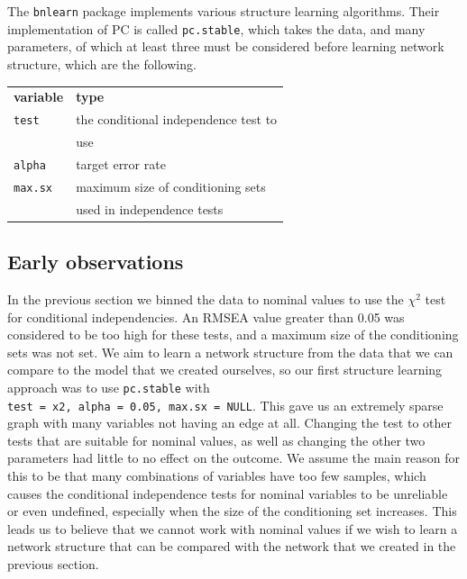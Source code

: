\documentclass[11pt,]{article}
\begin{document}
\begin{multicols}{2}
The \texttt{bnlearn} package implements various structure learning
algorithms. Their implementation of PC is called \texttt{pc.stable},
which takes the data, and many parameters, of which at least three must
be considered before learning network structure, which are the
following.

\medskip
\begin{tabular}{ll}
    \textbf{variable}   & \textbf{type} \\
    \texttt{test}       & the conditional independence test to \\
                        & use \\
    \texttt{alpha}      & target error rate \\
    \texttt{max.sx}     & maximum size of conditioning sets \\
                        & used in independence tests \\
\end{tabular}
\medskip

\hypertarget{early-observations}{%
\subsection{Early observations}\label{early-observations}}

In the previous section we binned the data to nominal values to use the
\(\chi^2\) test for conditional independencies. An RMSEA value greater
than 0.05 was considered to be too high for these tests, and a maximum
size of the conditioning sets was not set. We aim to learn a network
structure from the data that we can compare to the model that we created
ourselves, so our first structure learning approach was to use
\texttt{pc.stable} with
\texttt{test\ =\ \textquotesingle{}x2\textquotesingle{},\ alpha\ =\ 0.05,\ max.sx\ =\ NULL}.
This gave us an extremely sparse graph with many variables not having an
edge at all. Changing the test to other tests that are suitable for
nominal values, as well as changing the other two parameters had little
to no effect on the outcome. We assume the main reason for this to be
that many combinations of variables have too few samples, which causes
the conditional independence tests for nominal variables to be
unreliable or even undefined, especially when the size of the
conditioning set increases. This leads us to believe that we cannot work
with nominal values if we wish to learn a network structure that can be
compared with the network that we created in the previous section.


\end{multicols}
\end{document}

